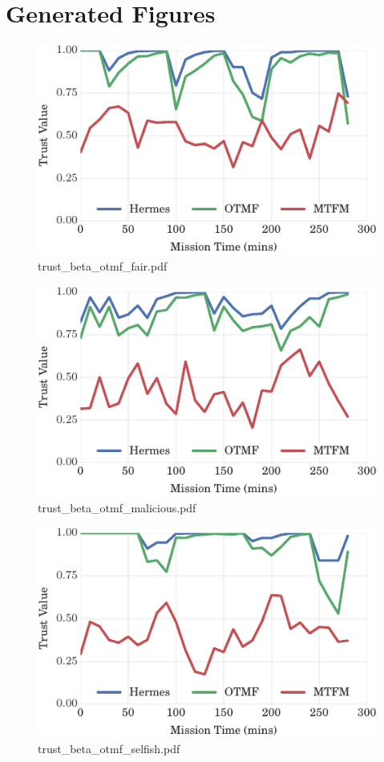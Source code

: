\documentclass{article}
\begin{document}
\section{Generated Figures}


\begin{figure}[h!]
\centering
\includegraphics[width=\linewidth]{trust_beta_otmf_fair.pdf}
\caption{trust\_beta\_otmf\_fair.pdf}
\end{figure}




\begin{figure}[h!]
\centering
\includegraphics[width=\linewidth]{trust_beta_otmf_malicious.pdf}
\caption{trust\_beta\_otmf\_malicious.pdf}
\end{figure}




\begin{figure}[h!]
\centering
\includegraphics[width=\linewidth]{trust_beta_otmf_selfish.pdf}
\caption{trust\_beta\_otmf\_selfish.pdf}
\end{figure}
\end{document}
